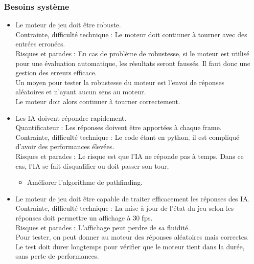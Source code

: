 \documentclass[french]{article}
\begin{document}
\subsubsection{Besoins système}
    \begin{itemize}
        \item Le moteur de jeu doit être robuste. \\
            Contrainte, difficulté technique : Le moteur doit continuer à tourner avec des entrées erronées. \\
            Risques et parades : En cas de problème de robustesse, si le moteur est utilisé pour une évaluation automatique, les résultats seront faussés. Il faut donc une gestion des erreurs efficace.\\
            Un moyen pour tester la robustesse du moteur est l'envoi de réponses aléatoires et n'ayant aucun sens au moteur.\\
            Le moteur doit alors continuer à tourner correctement.\\

        \item Les IA doivent répondre rapidement.\\
            Quantificateur : Les réponses doivent être apportées à chaque frame.\\
            Contrainte, difficulté technique : Le code étant en python, il est compliqué d'avoir des performances élevées.\\
            Risques et parades : Le risque est que l'IA ne réponde pas à temps. Dans ce cas, l'IA se fait disqualifier ou doit passer son tour.\\
            \begin{itemize}
                \item Améliorer l'algorithme de pathfinding.
            \end{itemize}
        
        \item Le moteur de jeu doit être capable de traiter efficacement les réponses des IA.\\
            Contrainte, difficulté technique :  La mise à jour de l'état du jeu selon les réponses doit permettre un affichage à 30 fps.\\
            Risques et parades : L'affichage peut perdre de sa fluidité.\\
            Pour tester, on peut donner au moteur des réponses aléatoires mais correctes. Le test doit durer longtemps pour vérifier que le moteur tient dans la durée, sans perte de performances.\\
        
    \end{itemize}
\end{document}
